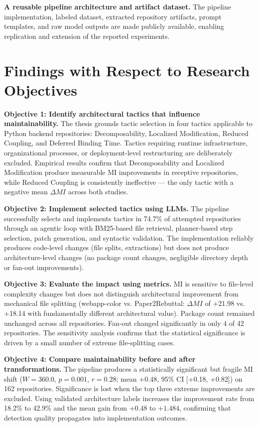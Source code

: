 \textbf{A reusable pipeline architecture and artifact dataset.} The pipeline implementation, labeled dataset, extracted repository artifacts, prompt templates, and raw model outputs are made publicly available, enabling replication and extension of the reported experiments.

\section{Findings with Respect to Research Objectives}

\textbf{Objective 1: Identify architectural tactics that influence maintainability.}
The thesis grounds tactic selection in four tactics applicable to Python backend repositories: Decomposability, Localized Modification, Reduced Coupling, and Deferred Binding Time. Tactics requiring runtime infrastructure, organizational processes, or deployment-level restructuring are deliberately excluded. Empirical results confirm that Decomposability and Localized Modification produce measurable MI improvements in receptive repositories, while Reduced Coupling is consistently ineffective — the only tactic with a negative mean $\Delta MI$ across both studies.

\textbf{Objective 2: Implement selected tactics using LLMs.}
The pipeline successfully selects and implements tactics in 74.7\% of attempted repositories through an agentic loop with BM25-based file retrieval, planner-based step selection, patch generation, and syntactic validation. The implementation reliably produces code-level changes (file splits, extractions) but does not produce architecture-level changes (no package count changes, negligible directory depth or fan-out improvements).

\textbf{Objective 3: Evaluate the impact using metrics.}
MI is sensitive to file-level complexity changes but does not distinguish architectural improvement from mechanical file splitting (webapp-color vs. Paper2Rebuttal: $\Delta MI$ of +21.98 vs. +18.14 with fundamentally different architectural value). Package count remained unchanged across all repositories. Fan-out changed significantly in only 4 of 42 repositories. The sensitivity analysis confirms that the statistical significance is driven by a small number of extreme file-splitting cases.

\textbf{Objective 4: Compare maintainability before and after transformations.}
The pipeline produces a statistically significant but fragile MI shift ($W = 360.0$, $p = 0.001$, $r = 0.28$; mean $+0.48$, 95\% CI [+0.18, +0.82]) on 162 repositories. Significance is lost when the top three extreme improvements are excluded. Using validated architecture labels increases the improvement rate from 18.2\% to 42.9\% and the mean gain from $+0.48$ to $+1.484$, confirming that detection quality propagates into implementation outcomes.

